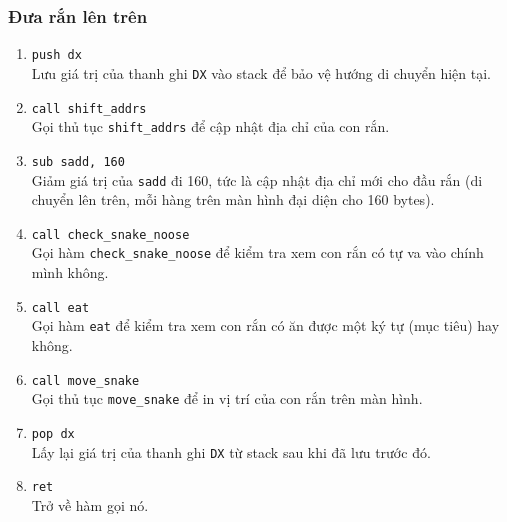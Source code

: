 \documentclass[12pt]{article}
\begin{document}
\subsubsection*{Đưa rắn lên trên}
\begin{enumerate}[label=\textbf{\arabic*.}]
      \begin{figure}[H]
  \centering
  \texttt{[image: pics/mu.png]}
\end{figure}
    \item \texttt{push dx} \\
    Lưu giá trị của thanh ghi \texttt{DX} vào stack để bảo vệ hướng di chuyển hiện tại.

    \item \texttt{call shift\_addrs} \\
    Gọi thủ tục \texttt{shift\_addrs} để cập nhật địa chỉ của con rắn.

    \item \texttt{sub sadd, 160} \\
    Giảm giá trị của \texttt{sadd} đi 160, tức là cập nhật địa chỉ mới cho đầu rắn (di chuyển lên trên, mỗi hàng trên màn hình đại diện cho 160 bytes).

    \item \texttt{call check\_snake\_noose} \\
    Gọi hàm \texttt{check\_snake\_noose} để kiểm tra xem con rắn có tự va vào chính mình không.

    \item \texttt{call eat} \\
    Gọi hàm \texttt{eat} để kiểm tra xem con rắn có ăn được một ký tự (mục tiêu) hay không.

    \item \texttt{call move\_snake} \\
    Gọi thủ tục \texttt{move\_snake} để in vị trí của con rắn trên màn hình.

    \item \texttt{pop dx} \\
    Lấy lại giá trị của thanh ghi \texttt{DX} từ stack sau khi đã lưu trước đó.

    \item \texttt{ret} \\
    Trở về hàm gọi nó.
\end{enumerate}
\end{document}
